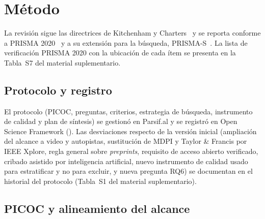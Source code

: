 \documentclass[12pt, a4paper]{article}
\begin{document}
\section{Método}
\label{sec:metodo}

La revisión sigue las directrices de Kitchenham y Charters~\cite{Kitchenham2007} y se reporta conforme a PRISMA 2020~\cite{page2021prisma} y a su extensión para la búsqueda, PRISMA-S~\cite{rethlefsen2021prismas}. La lista de verificación PRISMA 2020 con la ubicación de cada ítem se presenta en la Tabla~S7 del material suplementario.

\subsection{Protocolo y registro}

El protocolo (PICOC, preguntas, criterios, estrategia de búsqueda, instrumento de calidad y plan de síntesis) se gestionó en Parsif.al y se registró en Open Science Framework (\RegistroOSF). Las desviaciones respecto de la versión inicial (ampliación del alcance a video y autopistas, sustitución de MDPI y Taylor \& Francis por IEEE Xplore, regla general sobre \textit{preprints}, requisito de acceso abierto verificado, cribado asistido por inteligencia artificial, nuevo instrumento de calidad usado para estratificar y no para excluir, y nueva pregunta RQ6) se documentan en el historial del protocolo (Tabla~S1 del material suplementario).

\subsection{PICOC y alineamiento del alcance}
\end{document}

